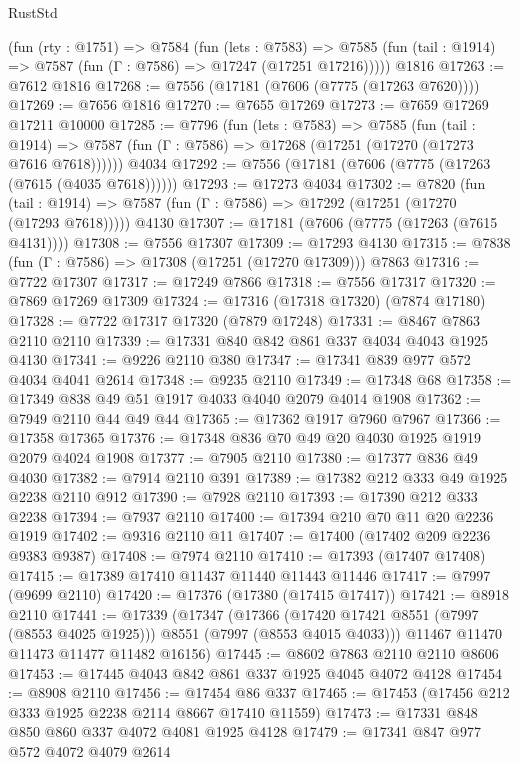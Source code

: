 \begin{lexlean}{RustStd}
\begin{coremodule}
    (fun (rty : @1751) =>
    @7584
      (fun (lets : @7583) =>
      @7585 (fun (tail : @1914) => @7587 (fun (Γ : @7586) => @17247 (@17251 @17216)))))
    @1816
@17263 := @7612 @1816
@17268 := @7556 (@17181 (@7606 (@7775 (@17263 @7620))))
@17269 := @7656 @1816
@17270 := @7655 @17269
@17273 := @7659 @17269 @17211 @10000
@17285 := @7796
    (fun (lets : @7583) =>
    @7585
      (fun (tail : @1914) =>
      @7587 (fun (Γ : @7586) => @17268 (@17251 (@17270 (@17273 @7616 @7618))))))
    @4034
@17292 := @7556 (@17181 (@7606 (@7775 (@17263 (@7615 (@4035 @7618))))))
@17293 := @17273 @4034
@17302 := @7820
    (fun (tail : @1914) => @7587 (fun (Γ : @7586) => @17292 (@17251 (@17270 (@17293 @7618)))))
    @4130
@17307 := @17181 (@7606 (@7775 (@17263 (@7615 @4131))))
@17308 := @7556 @17307
@17309 := @17293 @4130
@17315 := @7838 (fun (Γ : @7586) => @17308 (@17251 (@17270 @17309))) @7863
@17316 := @7722 @17307
@17317 := @17249 @7866
@17318 := @7556 @17317
@17320 := @7869 @17269 @17309
@17324 := @17316 (@17318 @17320) (@7874 @17180)
@17328 := @7722 @17317 @17320 (@7879 @17248)
@17331 := @8467 @7863 @2110 @2110
@17339 := @17331 @840 @842 @861 @337 @4034 @4043 @1925 @4130
@17341 := @9226 @2110 @380
@17347 := @17341 @839 @977 @572 @4034 @4041 @2614
@17348 := @9235 @2110
@17349 := @17348 @68
@17358 := @17349 @838 @49 @51 @1917 @4033 @4040 @2079 @4014 @1908
@17362 := @7949 @2110 @44 @49 @44
@17365 := @17362 @1917 @7960 @7967
@17366 := @17358 @17365
@17376 := @17348 @836 @70 @49 @20 @4030 @1925 @1919 @2079 @4024 @1908
@17377 := @7905 @2110
@17380 := @17377 @836 @49 @4030
@17382 := @7914 @2110 @391
@17389 := @17382 @212 @333 @49 @1925 @2238 @2110 @912
@17390 := @7928 @2110
@17393 := @17390 @212 @333 @2238
@17394 := @7937 @2110
@17400 := @17394 @210 @70 @11 @20 @2236 @1919
@17402 := @9316 @2110 @11
@17407 := @17400 (@17402 @209 @2236 @9383 @9387)
@17408 := @7974 @2110
@17410 := @17393 (@17407 @17408)
@17415 := @17389 @17410 @11437 @11440 @11443 @11446
@17417 := @7997 (@9699 @2110)
@17420 := @17376 (@17380 (@17415 @17417))
@17421 := @8918 @2110
@17441 := @17339
    (@17347
      (@17366 (@17420 @17421 @8551 (@7997 (@8553 @4025 @1925))) @8551 (@7997 (@8553 @4015 @4033)))
      @11467
      @11470
      @11473
      @11477
      @11482
      @16156)
@17445 := @8602 @7863 @2110 @2110 @8606
@17453 := @17445 @4043 @842 @861 @337 @1925 @4045 @4072 @4128
@17454 := @8908 @2110
@17456 := @17454 @86 @337
@17465 := @17453 (@17456 @212 @333 @1925 @2238 @2114 @8667 @17410 @11559)
@17473 := @17331 @848 @850 @860 @337 @4072 @4081 @1925 @4128
@17479 := @17341 @847 @977 @572 @4072 @4079 @2614

\end{coremodule}
\end{lexlean}
